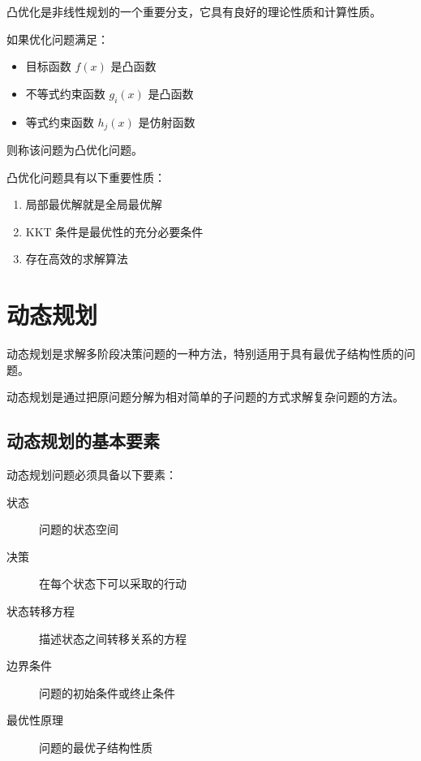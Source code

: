 凸优化是非线性规划的一个重要分支，它具有良好的理论性质和计算性质。

\begin{definition}[凸优化问题]\label{def:convex-optimization}
如果优化问题满足：
\begin{itemize}
    \item 目标函数 $f(x)$ 是凸函数
    \item 不等式约束函数 $g_i(x)$ 是凸函数
    \item 等式约束函数 $h_j(x)$ 是仿射函数
\end{itemize}
则称该问题为凸优化问题。
\end{definition}

\begin{property}[凸优化的性质]\label{prop:convex-properties}
凸优化问题具有以下重要性质：
\begin{enumerate}
    \item 局部最优解就是全局最优解
    \item KKT 条件是最优性的充分必要条件
    \item 存在高效的求解算法
\end{enumerate}
\end{property}

\section{动态规划}\label{sec:dynamic-programming}

动态规划是求解多阶段决策问题的一种方法，特别适用于具有最优子结构性质的问题。

\begin{definition}[动态规划]\label{def:dynamic-programming}
动态规划是通过把原问题分解为相对简单的子问题的方式求解复杂问题的方法。
\end{definition}

\subsection{动态规划的基本要素}

动态规划问题必须具备以下要素：

\begin{description}
    \item[状态] 问题的状态空间
    \item[决策] 在每个状态下可以采取的行动
    \item[状态转移方程] 描述状态之间转移关系的方程
    \item[边界条件] 问题的初始条件或终止条件
    \item[最优性原理] 问题的最优子结构性质
\end{description}

